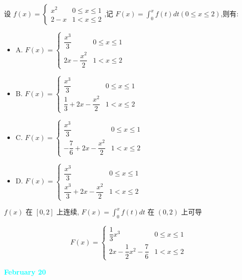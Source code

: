 \begin{example}[][Exam: 28.3.9]
	设 $f(x)=\begin{cases}
		x^{2} & 0\leq x\leq 1\\
		2-x & 1<x\leq 2 
	\end{cases}$,记 $F(x)=\int_{0}^{x}f(t)dt(0\leq x\leq 2)$,则有:
	\begin{itemize}
		\item A. $F(x)=
		\begin{cases}
			\dfrac{x^{3}}{3} & 0\leq x\leq 1\\
			2x-\dfrac{x^{2}}{2} & 1<x\leq 2
		\end{cases}$
		\item B. $F(x)=
		\begin{cases}
			\dfrac{x^{3}}{3} & 0\leq x\leq 1\\
			\dfrac{1}{3}+2x-\dfrac{x^{2}}{2} & 1<x\leq 2
		\end{cases}$
		\item C. $F(x)=
		\begin{cases}
			\dfrac{x^{3}}{3} & 0\leq x\leq 1\\
			-\dfrac{7}{6}+2x-\dfrac{x^{2}}{2} & 1<x\leq 2
		\end{cases}$
		\item D. $F(x)=
		\begin{cases}
			\dfrac{x^{3}}{3} & 0\leq x\leq 1\\
			\dfrac{x^{3}}{3}+2x-\dfrac{x^{2}}{2} & 1<x\leq 2
		\end{cases}$
	\end{itemize}
\end{example}
\begin{solution}

	$f(x)$ 在 $[0,2]$ 上连续, $F(x) = \int_{0}^{x}f(t)dt$ 在 $(0,2)$ 上可导

	$$F(x) = 
	\begin{cases}
		\dfrac{1}{3}x^{3}  & 0 \leq x \leq 1\\
		2x - \dfrac{1}{2}x^{2} - \dfrac{7}{6} & 1 < x \leq 2
	\end{cases}$$
\end{solution}

\textcolor{cyan}{\textbf{February 20}}

